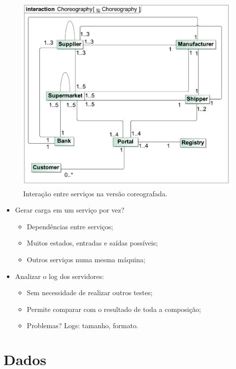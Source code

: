 \documentclass{beamer}
\begin{document}
\begin{frame}
\begin{figure}
\includegraphics[height=0.85\textheight,clip=true,trim=2mm 10mm 5mm 14mm]{figures/chor}
\caption{Interação entre serviços na versão coreografada.}
\end{figure}
\end{frame}

\begin{frame}
\begin{itemize}
  \item Gerar carga em um serviço por vez?
  \begin{itemize}
    \item Dependências entre serviços;
    \item Muitos estados, entradas e saídas possíveis;
    \item Outros serviços numa mesma máquina;
  \end{itemize}
  \item Analizar o log dos servidores:
  \begin{itemize}
    \item Sem necessidade de realizar outros testes;
    \item Permite comparar com o resultado de toda a composição;
    \item Problemas? Logs: tamanho, formato.
  \end{itemize}
\end{itemize}
\end{frame}

\section{Dados}
\begin{frame}
\end{frame}
\end{document}
